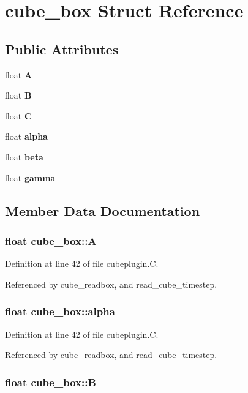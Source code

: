 \section{cube\_\-box  Struct Reference}
\label{structcube__box}
\subsection*{Public Attributes}
\begin{CompactItemize}
\item 
float {\bf A}
\item 
float {\bf B}
\item 
float {\bf C}
\item 
float {\bf alpha}
\item 
float {\bf beta}
\item 
float {\bf gamma}
\end{CompactItemize}


\subsection{Member Data Documentation}
\subsubsection{\setlength{\rightskip}{0pt plus 5cm}float cube\_\-box::A}\label{structcube__box_m0}




Definition at line 42 of file cubeplugin.C.

Referenced by cube\_\-readbox, and read\_\-cube\_\-timestep.
\subsubsection{\setlength{\rightskip}{0pt plus 5cm}float cube\_\-box::alpha}\label{structcube__box_m3}




Definition at line 42 of file cubeplugin.C.

Referenced by cube\_\-readbox, and read\_\-cube\_\-timestep.
\subsubsection{\setlength{\rightskip}{0pt plus 5cm}float cube\_\-box::B}\label{structcube__box_m1}




